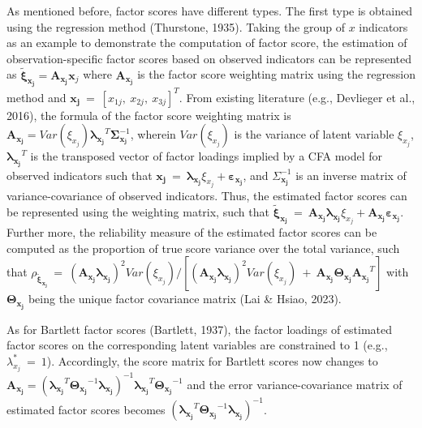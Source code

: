 \documentclass[
  11pt,
  man]{apa6}
\begin{document}
As mentioned before, factor scores have different types. The first type is obtained using the regression method (Thurstone, 1935). Taking the group of \(x\) indicators as an example to demonstrate the computation of factor score, the estimation of observation-specific factor scores based on observed indicators can be represented as \(\boldsymbol{\tilde{\xi}_{x_{j}}} = \boldsymbol{A_{x_{j}}} \boldsymbol{x}_{j}\) where \(\boldsymbol{A_{x_{j}}}\) is the factor score weighting matrix using the regression method and \(\boldsymbol{x_{j}} \ = \ [x_{1j}, \ x_{2j}, \ x_{3j}]^T\). From existing literature (e.g., Devlieger et al., 2016), the formula of the factor score weighting matrix is \(\boldsymbol{A_{x_{j}}} = Var(\xi_{x_{j}})\boldsymbol{\lambda_{x_{j}}}^T\boldsymbol{\Sigma}_{\boldsymbol{x_{j}}}^{-1}\), wherein \(Var(\xi_{x_{j}})\) is the variance of latent variable \(\xi_{x_{j}}\), \(\boldsymbol{\lambda_{x_{j}}}^T\) is the transposed vector of factor loadings implied by a CFA model for observed indicators such that \(\boldsymbol{x_{j}} \ = \ \boldsymbol{\lambda_{x_{j}}}\xi_{x_{j}} + \boldsymbol{\varepsilon_{x_{j}}}\), and \({\Sigma}_{\boldsymbol{x_{j}}}^{-1}\) is an inverse matrix of variance-covariance of observed indicators. Thus, the estimated factor scores can be represented using the weighting matrix, such that \(\boldsymbol{\tilde{\xi}_{x_{j}}} \ = \ \boldsymbol{A_{x_{j}}} \boldsymbol{\lambda_{x_{j}}}\xi_{x_{j}} + \boldsymbol{A_{x_{j}}}\boldsymbol{\varepsilon_{x_{j}}}\). Further more, the reliability measure of the estimated factor scores can be computed as the proportion of true score variance over the total variance, such that \(\rho_{\boldsymbol{\tilde{\xi}_{x_{j}}}} \ = \ (\boldsymbol{A_{x_{j}}} \boldsymbol{\lambda_{x_{j}}})^2Var(\xi_{x_{j}})/[(\boldsymbol{A_{x_{j}}} \boldsymbol{\lambda_{x_{j}}})^2Var(\xi_{x_{j}}) \ + \ \boldsymbol{A_{x_{j}}}\boldsymbol{\Theta_{x_{j}}}\boldsymbol{A_{x_{j}}}^T]\) with \(\boldsymbol{\Theta_{x_{j}}}\) being the unique factor covariance matrix (Lai \& Hsiao, 2023).

As for Bartlett factor scores (Bartlett, 1937), the factor loadings of estimated factor scores on the corresponding latent variables are constrained to 1 (e.g., \(\lambda_{x_{j}}^\text{*} \ = \ 1\)). Accordingly, the score matrix for Bartlett scores now changes to \(\boldsymbol{A_{x_{j}}} = (\boldsymbol{\lambda_{x_{j}}}^T\boldsymbol{\Theta_{x_{j}}}^{-1}\boldsymbol{\lambda_{x_{j}}})^{-1}\boldsymbol{\lambda_{x_{j}}}^T\boldsymbol{\Theta_{x_{j}}}^{-1}\) and the error variance-covariance matrix of estimated factor scores becomes \((\boldsymbol{\lambda_{x_{j}}}^T\boldsymbol{\Theta_{x_{j}}}^{-1}\boldsymbol{\lambda_{x_{j}}})^{-1}\).
\end{document}
